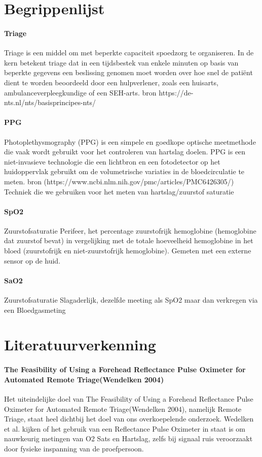 \documentclass[11pt]{article}
\begin{document}
    \section{Begrippenlijst}\label{sec:begrippenlijst}
    \paragraph{Triage}
    Triage is een middel om met beperkte capaciteit spoedzorg te organiseren. 
    In de kern betekent triage dat in een tijdsbestek van enkele minuten op basis van beperkte gegevens een beslissing genomen moet worden over hoe snel de patiënt dient te worden beoordeeld door een hulpverlener, zoals een huisarts, ambulanceverpleegkundige of een SEH-arts.    
    bron https://de-nts.nl/nts/basisprincipes-nts/

    \paragraph{PPG} 
    Photoplethysmography (PPG) is een simpele en goedkope optische meetmethode die vaak wordt gebruikt voor het controleren van hartslag doelen. 
    PPG is een niet-invasieve technologie die een lichtbron en een fotodetector op het huidoppervlak gebruikt om de volumetrische variaties in de bloedcirculatie te meten. 
    bron (https://www.ncbi.nlm.nih.gov/pmc/articles/PMC6426305/) Techniek die we gebruiken voor het meten van hartslag/zuurstof saturatie


    \paragraph{SpO2}
    Zuurstofsaturatie Perifeer,  het percentage zuurstofrijk hemoglobine (hemoglobine dat zuurstof bevat) in vergelijking met de totale hoeveelheid hemoglobine in het bloed (zuurstofrijk en niet-zuurstofrijk hemoglobine). 
    Gemeten met een externe sensor op de huid.

    \paragraph{SaO2} 
    Zuurstofsaturatie Slagaderlijk, dezelfde meeting als SpO2 maar dan verkregen via een Bloedgasmeting 


    \section{Literatuurverkenning}\label{sec:literatuur}
    \paragraph{The Feasibility of Using a Forehead Reflectance Pulse Oximeter for Automated Remote Triage(Wendelken 2004)}Het uiteindelijke doel van The Feasibility of Using a Forehead Reflectance Pulse Oximeter for Automated Remote Triage(Wendelken 2004), namelijk Remote Triage, staat heel dichtbij het doel van ons overkoepelende onderzoek. 
    Wedelken et al. kijken of het gebruik van een Reflectance Pulse Oximeter in staat is om nauwkeurig metingen van O2 Sats en Hartslag, zelfs bij signaal ruis veroorzaakt door fysieke inspanning van de proefpersoon.
\end{document}
